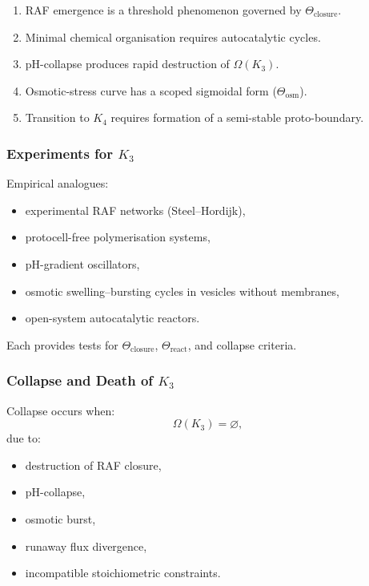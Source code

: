 \begin{enumerate}
    \item RAF emergence is a threshold phenomenon governed by
          $\Theta_{\mathrm{closure}}$.
    \item Minimal chemical organisation requires autocatalytic cycles.
    \item pH-collapse produces rapid destruction of $\Omega(K_3)$.
    \item Osmotic-stress curve has a scoped sigmoidal form
          ($\Theta_{\mathrm{osm}}$).
    \item Transition to $K_4$ requires formation of a semi-stable
          proto-boundary.
\end{enumerate}

\subsubsection{Experiments for \texorpdfstring{$K_3$}{K_3}}

Empirical analogues:
\begin{itemize}
    \item experimental RAF networks (Steel–Hordijk),
    \item protocell-free polymerisation systems,
    \item pH-gradient oscillators,
    \item osmotic swelling–bursting cycles in vesicles without membranes,
    \item open-system autocatalytic reactors.
\end{itemize}

Each provides tests for $\Theta_{\mathrm{closure}}$,
$\Theta_{\mathrm{react}}$, and collapse criteria.

\subsubsection{Collapse and Death of \texorpdfstring{$K_3$}{K_3}}
\label{sec:k3-collapse}

Collapse occurs when:
\[
\Omega(K_3) = \varnothing,
\]
due to:
\begin{itemize}
    \item destruction of RAF closure,
    \item pH-collapse,
    \item osmotic burst,
    \item runaway flux divergence,
    \item incompatible stoichiometric constraints.
\end{itemize}

